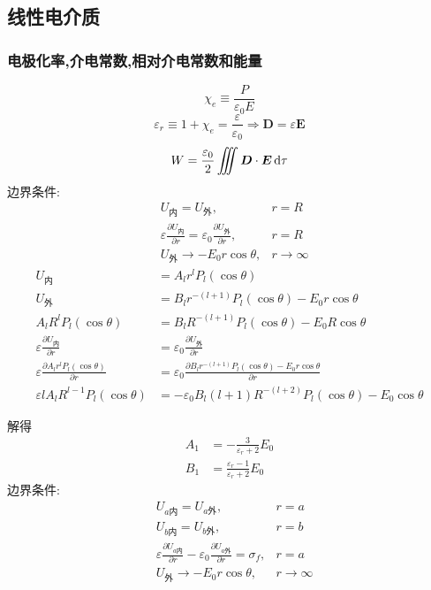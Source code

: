 \subsection{线性电介质}
\subsubsection{电极化率,介电常数,相对介电常数和能量}
\begin{equation}
    \chi_e\equiv\frac{P}{\varepsilon_0 E}
\end{equation}
\begin{equation}
    \varepsilon_r\equiv1+\chi_e=\frac{\varepsilon}{\varepsilon_0}\Rightarrow \boldsymbol{D}=\varepsilon\boldsymbol{E}
\end{equation}
\begin{equation}
W=\frac{\varepsilon_0}{2}\iiint \boldsymbol{D}\cdot\boldsymbol{E}\dif\tau
\end{equation}
边界条件:
\begin{align*}
    &U_\text{内}=U_\text{外},&r=R\\
    &\varepsilon\frac{\partial U_\text{内}}{\partial r}=\varepsilon_0\frac{\partial U_\text{外}}{\partial r},&r=R\\
    &U_\text{外}\to-{E}_0r\cos\theta,&r\to\infty
\end{align*}
\begin{align*}
    U_\text{内}&
=
A_l r^l
P_{l}(\cos\theta)\\
    U_\text{外}&
=
B_l r^{-(l+1)}
P_{l}(\cos\theta)-E_0r\cos\theta\\
A_l R^l
P_{l}(\cos\theta)&=B_l R^{-(l+1)}P_{l}(\cos\theta)-E_0R\cos\theta\\
\varepsilon\frac{\partial U_\text{内}}{\partial r}&=\varepsilon_0\frac{\partial U_\text{外}}{\partial r}\\
\varepsilon\frac{\partial A_l r^l
P_{l}(\cos\theta)}{\partial r}&=\varepsilon_0\frac{\partial B_l r^{-(l+1)}
P_{l}(\cos\theta)-E_0r\cos\theta}{\partial r}\\
\varepsilon lA_l R^{l-1}
P_{l}(\cos\theta)&=-\varepsilon_0B_l (l+1)R^{-(l+2)}
P_{l}(\cos\theta)-E_0\cos\theta
\end{align*}

解得
\begin{align*}
    A_1&=-\frac{3}{\varepsilon_r+2}E_0\\
    B_1&=\frac{\varepsilon_r-1}{\varepsilon_r+2}E_0
\end{align*}
边界条件:
\begin{align*}
    &U_{a\text{内}}=U_{a\text{外}},&r=a\\
    &U_{b\text{内}}=U_{b\text{外}},&r=b\\
    &\varepsilon\frac{\partial U_{a\text{内}}}{\partial r}-\varepsilon_0\frac{\partial U_{a\text{外}}}{\partial r}=\sigma_f,&r=a\\
    &U_\text{外}\to-{E}_0r\cos\theta,&r\to\infty
\end{align*}

